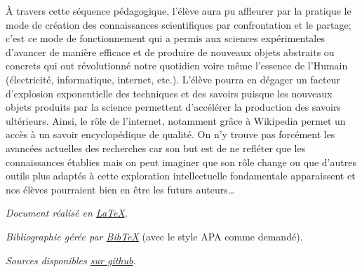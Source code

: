\documentclass[11pt,bibliography=totoc]{scrartcl}
\begin{document}
À travers cette séquence pédagogique, l'élève aura pu affleurer par la pratique
le mode de création des connaissances scientifiques par confrontation et
le partage; c'est ce mode de fonctionnement qui a permis aux sciences
expérimentales d'avancer de manière efficace et de produire de nouveaux objets
abstraits ou concrets qui ont révolutionné notre quotidien voire même l'essence
de l'Humain (électricité, informatique, internet, etc.). L'élève pourra en
dégager un facteur d'explosion exponentielle des techniques et des savoirs
puisque les nouveaux objets produits par la science permettent d'accélérer la
production des savoirs ultérieurs. Ainsi, le rôle de l'internet, notamment grâce
à Wikipedia permet un accès à un savoir encyclopédique de qualité. On n'y trouve
pas forcément les avancées actuelles des recherches car son but est de ne
refléter que les connaissances établies mais on peut imaginer que son rôle
change ou que d'autres outils plus adaptés à cette exploration intellectuelle
fondamentale apparaissent et nos élèves pourraient bien en être les futurs
auteurs\ldots

\printbibliography  %
\vfill
\emph{Document réalisé en \href{https://www.latex-project.org/}{\LaTeX}.}\par
\emph{Bibliographie gérée par \href{http://www.bibtex.org/}{Bib\TeX}} {\small
(avec le style APA comme demandé).}\par
\emph{Sources disponibles \href{https://github.com/Dalker/didac_010}{sur
    github}.}

\end{document}
